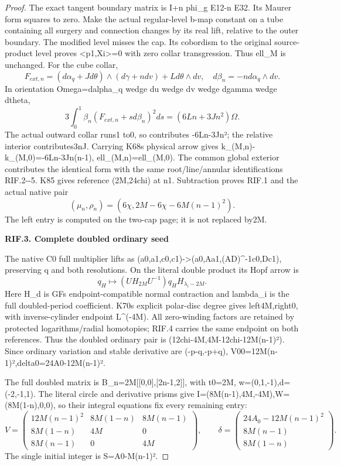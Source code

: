 \begin{proof}
The exact tangent boundary matrix is I+n phi\_g E12-n E32. Its Maurer
form squares to zero. Make the actual regular-level b-map constant
on a tube containing all surgery and connection changes by its real
lift, relative to the outer boundary. The modified level misses the
cap. Its cobordism to the original source-product level proves
\textless p1,Xi\textgreater=0 with zero collar transgression. Thus ell\_M is unchanged.
For the cube collar,
\[
F_{ext,n}=(d\alpha_q+Jd\theta)\wedge(d\gamma+n dv)+L d\theta\wedge dv,
\quad d\beta_n=-n d\alpha_q\wedge dv.
\]
In orientation Omega=dalpha\_q wedge du wedge dv wedge dgamma wedge dtheta,
\[
3\int_0^1\beta_n(F_{ext,n}+s d\beta_n)^2ds=(6Ln+3Jn^2)\Omega.
\]
The actual outward collar runs1 to0, so contributes -6Ln-3Jn²;
the relative interior contributes3nJ. Carrying K68\textquotesingle s physical arrow gives
k\_(M,n)-k\_(M,0)=-6Ln-3Jn(n-1), ell\_(M,n)=ell\_(M,0).
The common global exterior contributes the identical form with the
same root/line/annular identifications RIF.2-\/-5. K85 gives reference
(2M,24chi) at n1. Subtraction proves RIF.1 and the actual native pair
\[
                       (\mu_n,\rho_n)=(6\chi,2M-6\chi-6M(n-1)^2).
\tag{RIF.7}
\]
The left entry is computed on the two-cap page; it is not replaced by2M.

\par

\medskip\noindent\textbf{RIF.3. Complete doubled ordinary seed}

\par\nobreak

The native C0 full multiplier lifts as
(a0,a1,c0,c1)-\textgreater(a0,Aa1,(AD)\^{}-1c0,Dc1), preserving q and both
resolutions. On the literal double product its Hopf arrow is
\[
q_H\mapsto(UH_{2M}U^{-1})q_H H_{\lambda_i-2M}.
\tag{RIF.8}
\]
Here H\_d is GF\textquotesingle s endpoint-compatible normal contraction and lambda\_i
is the full doubled-period coefficient. K70\textquotesingle s explicit polar-disc
degree gives left4M,right0, with inverse-cylinder endpoint L\^{}(-4M).
All zero-winding factors are retained by protected logarithms/radial
homotopies; RIF.4 carries the same endpoint on both references.
Thus the doubled ordinary pair is
(12chi-4M,4M-12chi-12M(n-1)²). Since ordinary variation and stable
derivative are (-p-q,-p+q),
V00=12M(n-1)²,delta0=24A0-12M(n-1)².

The full doubled matrix is B\_n=2M{[}{[}0,0{]},{[}2n-1,2{]}{]}, with t0=2M,
w=(0,1,-1),d=(-2,-1,1). The literal circle and derivative prisms
give I=(8M(n-1),4M,-4M),W=(8M(1-n),0,0), so their integral equations
fix every remaining entry:
\[
V=\begin{pmatrix}12M(n-1)^2&8M(1-n)&8M(n-1)\\
8M(1-n)&4M&0\\8M(n-1)&0&4M\end{pmatrix},\qquad
\delta=\begin{pmatrix}24A_0-12M(n-1)^2\\8M(n-1)\\8M(1-n)\end{pmatrix}.
\tag{RIF.9}
\]
The single initial integer is S=A0-M(n-1)².


\end{proof}
